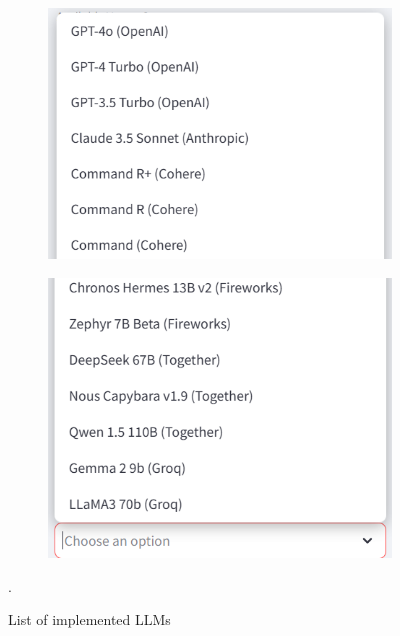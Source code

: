 \begin{figure}[htbp]
    \begin{subfigure}{\textwidth}
        \centering
        \includegraphics[width=.7\linewidth]{./figures/select-llms-p1.png}
    \end{subfigure}
    \begin{subfigure}{\textwidth}
        \centering
        \includegraphics[width=.7\linewidth]{./figures/select-llms-p2.png}
    \end{subfigure}
    \caption{List of implemented LLMs}.
\end{figure}\newpage
